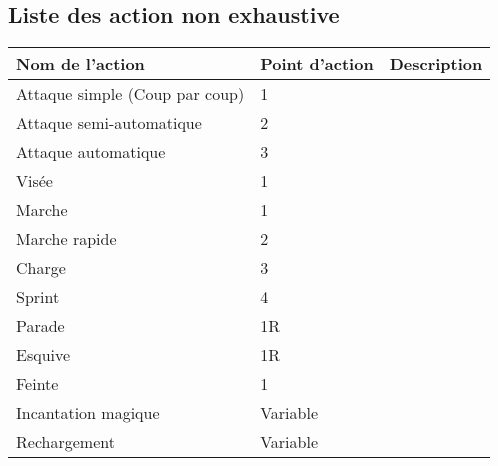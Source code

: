 \subsection{Liste des action non exhaustive}

\begin{tabular}{|l|l|l|}
\hline
Nom de l'action & Point d'action & Description \\ \hline
Attaque simple (Coup par coup) & 1 & \\ \hline
Attaque semi-automatique & 2 & \\ \hline
Attaque automatique & 3 & \\ \hline
Visée & 1 & \\ \hline
Marche & 1 & \\ \hline
Marche rapide & 2 & \\ \hline
Charge & 3 & \\ \hline
Sprint & 4 & \\ \hline
Parade & 1R & \\ \hline
Esquive & 1R & \\ \hline
Feinte & 1 & \\ \hline
Incantation magique & Variable & \\ \hline
Rechargement & Variable & \\ \hline


\hline
\end{tabular}